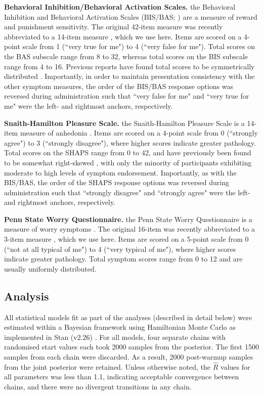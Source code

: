 \documentclass[a4paper,notitlepage,12pt]{article}
\begin{document}
\textbf{Behavioral Inhibition/Behavioral Activation Scales.} the Behavioral Inhibition and Behavioral Activation Scales (BIS/BAS; \cite{carver1994behavioral}) are a measure of reward and punishment sensitivity. The original 42-item measure was recently abbreviated to a 14-item measure \cite{pagliaccio2016revising}, which we use here. Items are scored on a 4-point scale from 1 (``very true for me") to 4 (``very false for me"). Total scores on the BAS subscale range from 8 to 32, whereas total scores on the BIS subscale range from 4 to 16. Previous reports have found total scores to be symmetrically distributed \cite{cooper2007behavioural}. Importantly, in order to maintain presentation consistency with the other symptom measures, the order of the BIS/BAS response options was reversed during administration such that ``very false for me" and ``very true for me" were the left- and rightmost anchors, respectively. 

\textbf{Snaith-Hamilton Pleasure Scale.} the Snaith-Hamilton Pleasure Scale is a 14-item measure of anhedonia \cite{snaith1995scale}. Items are scored on a 4-point scale from 0 (``strongly agree") to 3 (``strongly disagree"), where higher scores indicate greater pathology. Total scores on the SHAPS range from 0 to 42, and have previously been found to be somewhat right-skewed \cite{franken2007assessment, leventhal2015measuring}, with only the minority of participants exhibiting moderate to high levels of symptom endorsement. Importantly, as with the BIS/BAS, the order of the SHAPS response options was reversed during administration such that ``strongly disagree" and ``strongly agree" were the left- and rightmost anchors, respectively.

\textbf{Penn State Worry Questionnaire.} the Penn State Worry Questionnaire is a measure of worry symptoms \cite{meyer1990development}. The original 16-item was recently abbreviated to a 3-item measure \cite{kertz2014psychometric}, which we use here. Items are scored on a 5-point scale from 0 (``not at all typical of me") to 4 (``very typical of me"), where higher scores indicate greater pathology. Total symptom scores range from 0 to 12 and are usually uniformly distributed.

\subsection*{Analysis}

All statistical models fit as part of the analyses (described in detail below) were estimated within a Bayesian framework using Hamiltonian Monte Carlo as implemented in Stan (v2.26) \cite{stan}. For all models, four separate chains with randomised start values each took 2000 samples from the posterior. The first 1500 samples from each chain were discarded. As a result, 2000 post-warmup samples from the joint posterior were retained. Unless otherwise noted, the $\hat{R}$ values for all parameters was less than 1.1, indicating acceptable convergence between chains, and there were no divergent transitions in any chain. 
\end{document}
